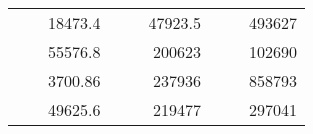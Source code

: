 \begin{table}[H]
\begin{tabular}{|ccrccrccc}
\rowcolor[HTML]{DDFDFF} 
\multicolumn{1}{|c|}{\cellcolor[HTML]{FFFFC7}}                                & \multicolumn{1}{c|}{\cellcolor[HTML]{DDFDFF}}                      & \multicolumn{1}{r|}{\cellcolor[HTML]{DAE8FC}18473.4}   & \multicolumn{1}{c|}{\cellcolor[HTML]{FFFFC7}}                                & \multicolumn{1}{c|}{\cellcolor[HTML]{DDFDFF}}                       & \multicolumn{1}{r|}{\cellcolor[HTML]{DDFDFF}47923.5}   & \multicolumn{1}{c|}{\cellcolor[HTML]{FFFFC7}}                                & \multicolumn{1}{c|}{\cellcolor[HTML]{DDFDFF}}                      & \multicolumn{1}{r|}{\cellcolor[HTML]{DDFDFF}493627}    \\ \cline{3-3} \cline{6-6} \cline{9-9} 
\multicolumn{1}{|c|}{\cellcolor[HTML]{FFFFC7}}                                & \multicolumn{1}{c|}{\cellcolor[HTML]{DDFDFF}}                      & \multicolumn{1}{r|}{\cellcolor[HTML]{DDFDFF}55576.8}   & \multicolumn{1}{c|}{\cellcolor[HTML]{FFFFC7}}                                & \multicolumn{1}{c|}{\cellcolor[HTML]{DDFDFF}}                       & \multicolumn{1}{r|}{\cellcolor[HTML]{DAE8FC}200623}    & \multicolumn{1}{c|}{\cellcolor[HTML]{FFFFC7}}                                & \multicolumn{1}{c|}{\cellcolor[HTML]{DDFDFF}}                      & \multicolumn{1}{r|}{\cellcolor[HTML]{DAE8FC}102690}    \\ \cline{3-3} \cline{6-6} \cline{9-9} 
\rowcolor[HTML]{DDFDFF} 
\multicolumn{1}{|c|}{\cellcolor[HTML]{FFFFC7}}                                & \multicolumn{1}{c|}{\cellcolor[HTML]{DDFDFF}}                      & \multicolumn{1}{r|}{\cellcolor[HTML]{DAE8FC}3700.86}   & \multicolumn{1}{c|}{\cellcolor[HTML]{FFFFC7}}                                & \multicolumn{1}{c|}{\cellcolor[HTML]{DDFDFF}}                       & \multicolumn{1}{r|}{\cellcolor[HTML]{DDFDFF}237936}    & \multicolumn{1}{c|}{\cellcolor[HTML]{FFFFC7}}                                & \multicolumn{1}{c|}{\cellcolor[HTML]{DDFDFF}}                      & \multicolumn{1}{r|}{\cellcolor[HTML]{DDFDFF}858793}    \\ \cline{3-3} \cline{6-6} \cline{9-9} 
\multicolumn{1}{|c|}{\cellcolor[HTML]{FFFFC7}}                                & \multicolumn{1}{c|}{\cellcolor[HTML]{DDFDFF}}                      & \multicolumn{1}{r|}{\cellcolor[HTML]{DDFDFF}49625.6}   & \multicolumn{1}{c|}{\cellcolor[HTML]{FFFFC7}}                                & \multicolumn{1}{c|}{\cellcolor[HTML]{DDFDFF}}                       & \multicolumn{1}{r|}{\cellcolor[HTML]{DAE8FC}219477}    & \multicolumn{1}{c|}{\cellcolor[HTML]{FFFFC7}}                                & \multicolumn{1}{c|}{\cellcolor[HTML]{DDFDFF}}                      & \multicolumn{1}{r|}{\cellcolor[HTML]{DAE8FC}297041}    \\ \cline{3-3} \cline{6-6} \cline{9-9} 

\end{tabular}
\end{table}
